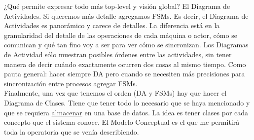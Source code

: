 \documentclass[]{article}
\begin{document}
¿Qué permite expresar todo más top-level y visión global? El Diagrama de Actividades. Si queremos más detalle agregamos FSMs. Es decir, el Diagrama de Actividades es panorámico y carece de detalles. La diferencia está en la granularidad del detalle de las operaciones de cada máquina o actor, cómo se comunican y qué tan fino voy a ser para ver cómo se sincronizan. Los Diagramas de Actividad sólo muestran posibles órdenes entre las actividades, sin tener manera de decir cuándo exactamente ocurren dos cosas al mismo tiempo. Como pauta general: hacer siempre DA pero cuando se necesiten más precisiones para sincronización entre procesos agregar FSMs.\\

Finalmente, una vez que tenemos el orden (DA y FSMs) hay que hacer el Diagrama de Clases. Tiene que tener todo lo necesario que se haya mencionado y que se requiera \underline{almacenar} en una base de datos. La idea es tener clases por cada concepto que el sistema conoce. El Modelo Conceptual es el que me permitirá toda la operatoria que se venía describiendo.

\newpage
\end{document}
